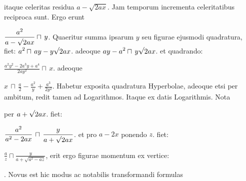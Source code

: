 itaque celeritas residua
$\displaystyle a - \sqrt{2ax}$.
Jam temporum incrementa celeritatibus reciproca sunt. 
Ergo erunt
\rule[-4mm]{0mm}{10mm}$\displaystyle \frac{a^2}{a - \sqrt{\protect\vphantom{2ax}} 2ax} \sqcap \, y$.
Quaeritur summa ipsarum $\displaystyle y$ seu figurae ejusmodi quadratura, fiet:
$\displaystyle a^2 \sqcap \, ay - y \sqrt{\protect\vphantom{2ax}} 2ax$.
adeoque
$\displaystyle ay - a^2 \sqcap \, y \sqrt{\protect\vphantom{2ax}} 2ax$.
et quadrando:
\rule[-4mm]{0mm}{10mm}$\displaystyle \frac{a^2y^2 - 2a^3y + a^4}{2ay^2} \sqcap \, x$. adeoque
\rule[-4mm]{0mm}{10mm}$\displaystyle x \, \sqcap \, \frac{a}{2} - \frac{a^2}{y} + \frac{a^3}{2y^2}$.
Habetur  exposita quadratura Hyperbolae, adeoque etsi per ambitum, redit tamen ad
\pend
\count{}
\pstart
\noindent Logarithmos. Itaque ex datis
Logarithmis.
Nota \rule[-4mm]{0mm}{10mm} per 
$\displaystyle a + \sqrt{\protect\vphantom{2ax}}2ax$.
fiet:
\rule[-4mm]{0mm}{10mm}$\displaystyle \frac{a^2}{a^2 - 2ax} \, \sqcap \, \frac{y}{a + \sqrt{\protect\vphantom{2ax}}2ax}$.
et pro 
$\displaystyle a - 2x$ ponendo $\displaystyle z$.
fiet:
\rule[-4mm]{0mm}{10mm}$\displaystyle \frac{a}{z} \sqcap \frac{y}{a + \sqrt{a^2 - az}}$,
erit ergo figurae momentum ex vertice:
\rule[-4mm]{0mm}{10mm}
{
}. 
Novus est hic modus ac notabilis transformandi formulas 
